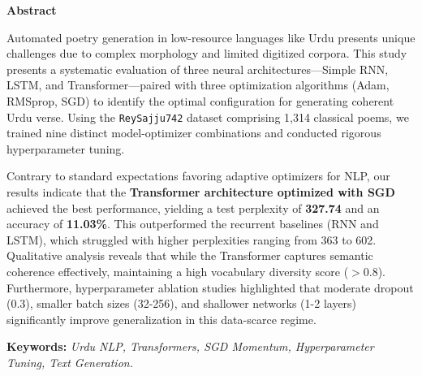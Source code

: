 \documentclass[12pt,a4paper]{article}
\begin{document}
\newpage
\thispagestyle{empty}

\vspace*{3cm}
\begin{tcolorbox}[
    colback=white,
    colframe=lightgray,
    boxrule=2pt,
    arc=0mm,
    width=\textwidth,
    top=1cm, bottom=1cm, left=1cm, right=1cm
]
    \begin{center}
        \Large\textbf{\color{primarycolor}Abstract}
    \end{center}
    \vspace{0.5cm}
    \noindent
    Automated poetry generation in low-resource languages like Urdu presents unique challenges due to complex morphology and limited digitized corpora. This study presents a systematic evaluation of three neural architectures—Simple RNN, LSTM, and Transformer—paired with three optimization algorithms (Adam, RMSprop, SGD) to identify the optimal configuration for generating coherent Urdu verse. Using the \texttt{ReySajju742} dataset comprising 1,314 classical poems, we trained nine distinct model-optimizer combinations and conducted rigorous hyperparameter tuning.
    
    \vspace{0.5cm}
    \noindent
    Contrary to standard expectations favoring adaptive optimizers for NLP, our results indicate that the \textbf{Transformer architecture optimized with SGD} achieved the best performance, yielding a test perplexity of \textbf{327.74} and an accuracy of \textbf{11.03\%}. This outperformed the recurrent baselines (RNN and LSTM), which struggled with higher perplexities ranging from 363 to 602. Qualitative analysis reveals that while the Transformer captures semantic coherence effectively, maintaining a high vocabulary diversity score ($>0.8$). Furthermore, hyperparameter ablation studies highlighted that moderate dropout (0.3), smaller batch sizes (32-256), and shallower networks (1-2 layers) significantly improve generalization in this data-scarce regime.
    
    \vspace{0.8cm}
    \noindent \textbf{\color{secondarycolor}Keywords:} \textit{Urdu NLP, Transformers, SGD Momentum, Hyperparameter Tuning, Text Generation.}
\end{tcolorbox}
\newpage

\tableofcontents
\newpage
\end{document}
